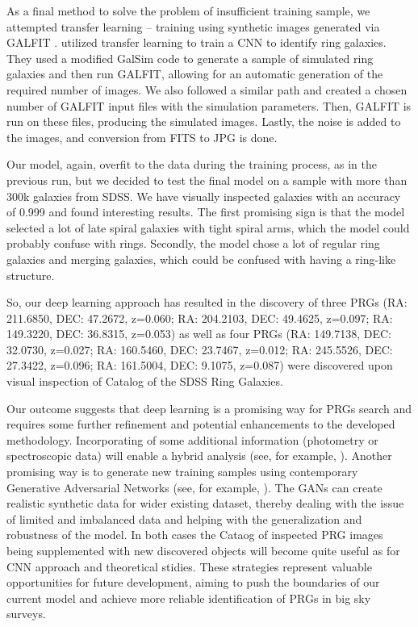 \documentclass{aa}
\begin{document}
As a final method to solve the problem of insufficient training sample, we attempted transfer learning -- training using synthetic images generated via GALFIT \citep{Peng2002}. \cite{Krishnakumar2022} utilized transfer learning to train a CNN to identify ring galaxies. They used a modified GalSim code \cite{Ghosh2020} to generate a sample of simulated ring galaxies and then run GALFIT, allowing for an automatic generation of the required number of images. We also followed a similar path and created a chosen number of GALFIT input files with the simulation parameters. Then, GALFIT is run on these files, producing the simulated images. Lastly, the noise is added to the images, and conversion from FITS to JPG is done. 

Our model, again, overfit to the data during the training process, as in the previous run, but we decided to test the final model on a \cite{Vavilova2021} sample with more than 300k galaxies from SDSS. We have visually inspected galaxies with an accuracy of 0.999 and found interesting results. The first promising sign is that the model selected a lot of late spiral galaxies with tight spiral arms, which the model could probably confuse with rings. Secondly, the model chose a lot of regular ring galaxies and merging galaxies, which could be confused with having a ring-like structure. 

So, our deep learning approach has resulted in the discovery of three PRGs (RA: 211.6850, DEC: 47.2672, z=0.060; RA: 204.2103, DEC: 49.4625, z=0.097; RA: 149.3220, DEC: 36.8315, z=0.053) as well as four PRGs (RA: 149.7138, DEC: 32.0730, z=0.027; RA: 160.5460, DEC: 23.7467, z=0.012; RA: 245.5526, DEC: 27.3422, z=0.096; RA: 161.5004, DEC: 9.1075, z=0.087) were discovered upon visual inspection of Catalog of the SDSS Ring Galaxies. 

Our outcome suggests that deep learning is a promising way for PRGs search and requires some further refinement and potential enhancements to the developed methodology. Incorporating of some additional information (photometry or spectroscopic data) will enable a hybrid analysis (see, for example, \cite{Gutirrez2011}). Another promising way is to generate new training samples using contemporary Generative Adversarial Networks (see, for example, \cite{Goodfellow2014, Vavilova2018}). The GANs can create realistic synthetic data for wider existing dataset, thereby dealing with the issue of limited and imbalanced data and helping with the generalization and robustness of the model. In both cases the Cataog of inspected PRG images being supplemented with new discovered objects will become quite useful as for CNN approach and theoretical stidies. These strategies represent valuable opportunities for future development, aiming to push the boundaries of our current model and achieve more reliable identification of PRGs in big sky surveys.
\end{document}
